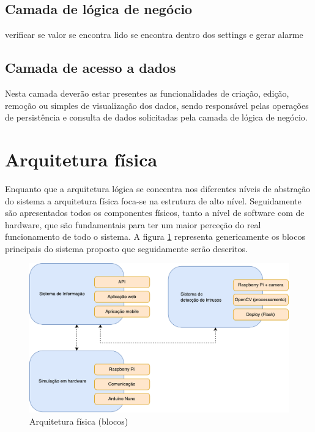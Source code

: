 \subsection{Camada de lógica de negócio}



verificar se valor se encontra lido se encontra dentro dos settings e gerar alarme 


\subsection{Camada de acesso a dados}


Nesta camada deverão estar presentes as funcionalidades de criação, edição, remoção ou simples de visualização dos dados, sendo responsável pelas operações
de persistência e consulta de dados solicitadas pela camada de lógica de negócio.




\newpage
\section{Arquitetura física}


Enquanto que a arquitetura lógica se concentra nos diferentes níveis de abstração do sistema a arquitetura física foca-se na estrutura de alto nível.  
Seguidamente são apresentados todos os componentes físicos, tanto  a nível de software com de hardware, que são fundamentais para ter um maior perceção do real funcionamento de todo o sistema. 
A figura \ref{fisicablocos} representa genericamente os blocos principais do sistema proposto que seguidamente serão descritos. 


\begin{figure}[h]
	\centering
	\includegraphics[scale=0.45]{esquemas/esquema-blocos.pdf}
	\caption{Arquitetura física (blocos)}
	\label{fisicablocos}
\end{figure}


